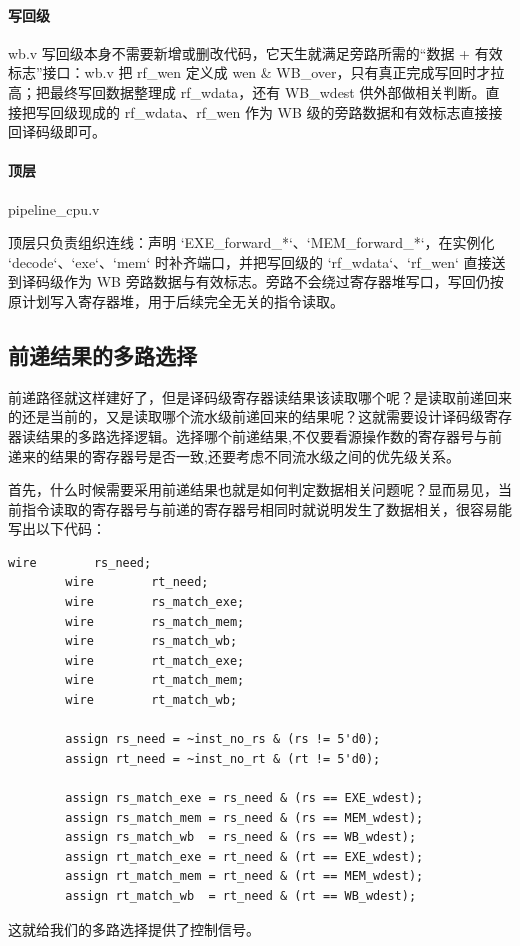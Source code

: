\documentclass[a4paper]{article}
\begin{document}
	\paragraph{写回级} wb.v
	写回级本身不需要新增或删改代码，它天生就满足旁路所需的“数据 + 有效标志”接口：wb.v 把 rf\_wen 定义成 wen \& WB\_over，只有真正完成写回时才拉高；把最终写回数据整理成 rf\_wdata，还有 WB\_wdest 供外部做相关判断。直接把写回级现成的 rf\_wdata、rf\_wen 作为 WB 级的旁路数据和有效标志直接接回译码级即可。
	
	\paragraph{顶层} pipeline\_cpu.v
	
	顶层只负责组织连线：声明 `EXE\_forward\_*`、`MEM\_forward\_*`，在实例化 `decode`、`exe`、`mem` 时补齐端口，并把写回级的 `rf\_wdata`、`rf\_wen` 直接送到译码级作为 WB 旁路数据与有效标志。旁路不会绕过寄存器堆写口，写回仍按原计划写入寄存器堆，用于后续完全无关的指令读取。
	
	\subsection{前递结果的多路选择}
	前递路径就这样建好了，但是译码级寄存器读结果该读取哪个呢？是读取前递回来的还是当前的，又是读取哪个流水级前递回来的结果呢？这就需要设计译码级寄存器读结果的多路选择逻辑。选择哪个前递结果,不仅要看源操作数的寄存器号与前递来的结果的寄存器号是否一致,还要考虑不同流水级之间的优先级关系。
	
	首先，什么时候需要采用前递结果也就是如何判定数据相关问题呢？显而易见，当前指令读取的寄存器号与前递的寄存器号相同时就说明发生了数据相关，很容易能写出以下代码：
	\begin{lstlisting}[caption={decode.v}]
		wire        rs_need;
		wire        rt_need;
		wire        rs_match_exe;
		wire        rs_match_mem;
		wire        rs_match_wb;
		wire        rt_match_exe;
		wire        rt_match_mem;
		wire        rt_match_wb;
		
		assign rs_need = ~inst_no_rs & (rs != 5'd0);
		assign rt_need = ~inst_no_rt & (rt != 5'd0);
		
		assign rs_match_exe = rs_need & (rs == EXE_wdest);
		assign rs_match_mem = rs_need & (rs == MEM_wdest);
		assign rs_match_wb  = rs_need & (rs == WB_wdest);
		assign rt_match_exe = rt_need & (rt == EXE_wdest);
		assign rt_match_mem = rt_need & (rt == MEM_wdest);
		assign rt_match_wb  = rt_need & (rt == WB_wdest);
	\end{lstlisting}
	这就给我们的多路选择提供了控制信号。
	
\end{document}
